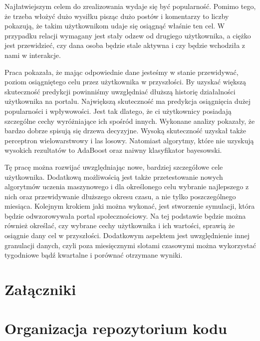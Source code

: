 \documentclass[polish,12pt]{aghthesis}
\begin{document}
Najłatwiejszym celem do zrealizowania wydaje się być popularność. Pomimo tego, że trzeba włożyć dużo wysiłku pisząc dużo postów i komentarzy to liczby pokazują, że takim użytkownikom udaje się osiągnąć właśnie ten cel. W przypadku relacji wymagany jest stały odzew od drugiego użytkownika, a ciężko jest przewidzieć, czy dana osoba będzie stale aktywna i czy będzie wchodziła z nami w interakcje.


Praca pokazała, że mając odpowiednie dane jesteśmy w stanie przewidywać, poziom osiągniętego celu przez użytkownika w przyszłości. By uzyskać większą skuteczność predykcji powinniśmy uwzględniać dłuższą historię działalności użytkownika na portalu. Największą skuteczność ma predykcja osiągnięcia dużej popularności i wpływowości. Jest tak dlatego, że ci użytkownicy posiadają szczególne cechy wyróżniające ich spośród innych. Wykonane analizy pokazały, że bardzo dobrze spisują się drzewa decyzyjne. Wysoką skuteczność uzyskał także perceptron wielowarstwowy i las losowy. Natomiast algorytmy, które nie uzyskują wysokich rezultatów to AdaBoost oraz naiwny klasyfikator bayesowski. 

\vspace{5mm}

Tę pracę można rozwijać uwzględniając nowe, bardziej szczegółowe cele użytkownika. Dodatkową możliwością jest także przetestowanie nowych algorytmów uczenia maszynowego i dla określonego celu wybranie najlepszego z nich oraz przewidywanie dłuższego okresu czasu, a nie tylko poszczególnego miesiąca. Kolejnym krokiem jaki można wykonać, jest stworzenie symulacji, która będzie odwzorowywała portal społecznościowy. Na tej podstawie będzie można również określać, czy wybrane cechy użytkownika i ich wartości, sprawią że osiągnie dany cel w przyszłości. Dodatkowym aspektem jest uwzględnienie innej granulacji danych, czyli poza miesięcznymi slotami czasowymi można wykorzystać tygodniowe bądź kwartalne i porównać otrzymane wyniki.

\newpage


\newpage

\listoffigures
\listoftables

\newpage
\section*{Załączniki}
\appendix

\section{Organizacja repozytorium kodu}
\end{document}
